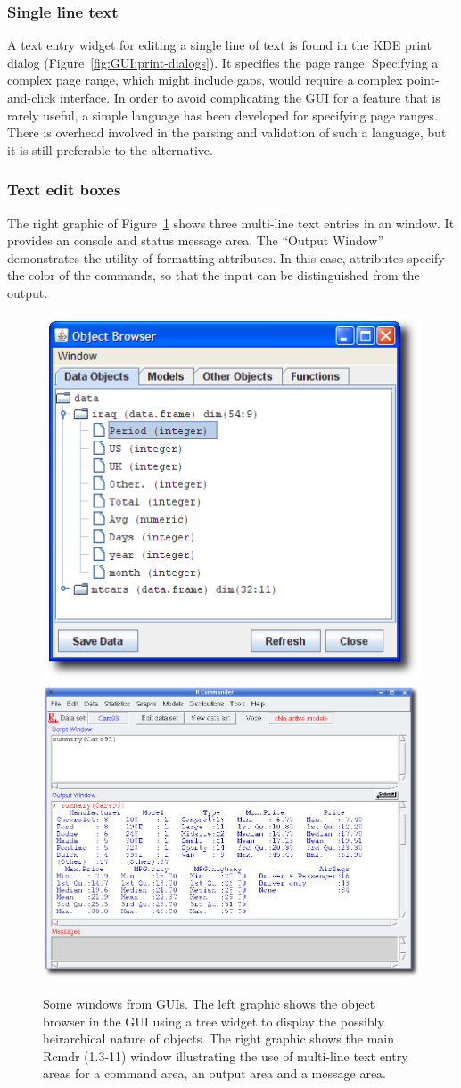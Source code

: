 \subsubsection{Single line text}
\label{sec:GUI:single-line-text}

A text entry widget for editing a single line of text is found in the
KDE print dialog (Figure~\ref{fig:GUI:print-dialogs}). It specifies
the page range. Specifying a complex page range, which might include
gaps, would require a complex point-and-click interface. In
order to avoid complicating the GUI for a feature that is rarely
useful, a simple language has been developed for specifying page
ranges. There is overhead involved in the parsing and validation of
such a language, but it is still preferable to the alternative.

\subsubsection{Text edit boxes}
\label{sec:GUI:textboxes}

The right graphic
of Figure~\ref{fig:GUI:R-guis-exs-JGR-Rcmdr} shows three multi-line text entries
in an  window. It provides an \R\/ console and status message area. The
``Output Window'' demonstrates the utility of formatting
attributes. In this case, attributes specify the color of
the commands, so that the input can be distinguished from the output.

\begin{figure}
  \centering
  \includegraphics[width=.35\textwidth]{JGR-object-browser}
  \includegraphics[width=.5\textwidth]{Rcmdr-main-window}
  \caption{
    Some windows from \R\/ GUIs.
    The left graphic shows the object browser in the  GUI
    using a tree widget 
    to display the possibly heirarchical nature of \R\/ objects.
    The right graphic shows the main Rcmdr (1.3-11) window
    illustrating the use of multi-line text entry areas for a command
    area, an output area and a message area.}
  \label{fig:GUI:R-guis-exs-JGR-Rcmdr}
\end{figure}


